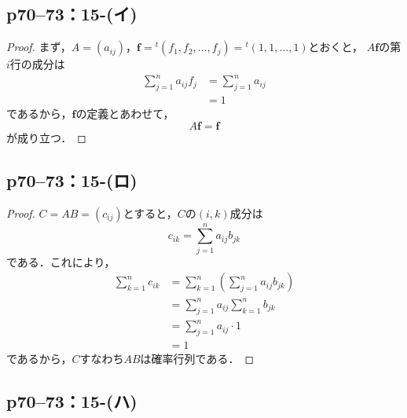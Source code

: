 \documentclass[a4paper,10pt,fleqn]{ltjsarticle}
\begin{document}
\subsection*{p70--73：15-(イ)}
\begin{leftbar}
    \begin{proof}
        まず，$A=(a_{ij})$，$\bm{f} = {}^t (f_1 , f_2,\dots,f_j) ={}^t (1,1,\dots,1)$とおくと，
        $A \bm{f}$の第$i$行の成分は
        \begin{align*}
            \sum_{j=1}^{n} a_{ij} f_j & = \sum_{j=1}^{n} a_{ij} \\
                                      & =1
        \end{align*}
        であるから，$\bm{f}$の定義とあわせて，
        \[
            A \bm{f} =\bm{f}
        \]
        が成り立つ．
    \end{proof}
\end{leftbar}


\subsection*{p70--73：15-(ロ)}

\begin{tleftbar}
    \begin{proof}
        $C =AB=(c_{ij})$とすると，$C$の$(i,k)$成分は
        \[
            c_{ik}  =\sum_{j=1}^{n} a_{ij} b_{jk}
        \]
        である．これにより，
        \begin{align*}
            \sum_{k=1}^{n} c_{ik} & = \sum_{k=1}^{n} \left (\sum_{j=1}^{n} a_{ij} b_{jk}\right) \\
                                  & = \sum_{j=1}^{n} a_{ij} \sum_{k=1}^{n} b_{jk}               \\
                                  & = \sum_{j=1}^{n} a_{ij} \cdot 1                             \\
                                  & = 1
        \end{align*}
        であるから，$C$すなわち$AB$は確率行列である．
    \end{proof}
\end{tleftbar}

\subsection*{p70--73：15-(ハ)}
\end{document}
